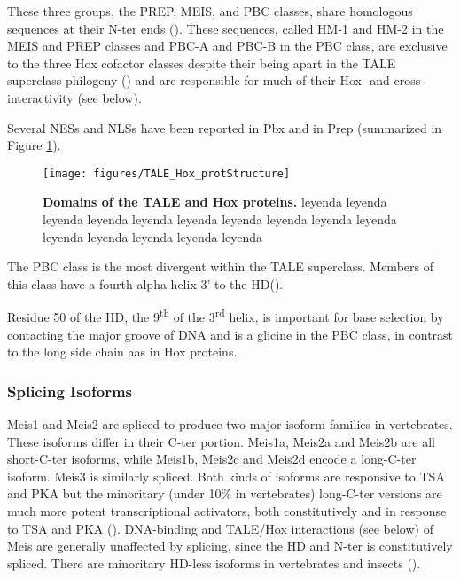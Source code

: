 These three groups, the PREP, MEIS, and PBC classes, share homologous sequences at their \ac{N-ter} ends (\cite{Burglin1998}). These sequences, called HM-1 and HM-2 in the MEIS and PREP classes and PBC-A and PBC-B in the PBC class, are exclusive to the three Hox cofactor classes despite their being apart in the \ac{TALE} superclass philogeny (\cite{Mukherjee2007}) and are responsible for much of their Hox- and cross-interactivity (see below).

Several \acp{NES} and \acp{NLS} have been reported in Pbx and in Prep (summarized in Figure \ref{fig:TALE_Hox_protStructure}).

\begin{figure}[]
  
  \centering
  \texttt{[image: figures/TALE\_Hox\_protStructure]}
  \caption[Domains of the TALE and Hox proteins]{\textbf{Domains of the TALE and Hox proteins.} leyenda leyenda leyenda leyenda leyenda leyenda leyenda leyenda leyenda leyenda leyenda leyenda leyenda leyenda leyenda}
  \label{fig:TALE_Hox_protStructure}
\end{figure}

The PBC class is the most divergent within the \ac{TALE} superclass. Members of this class have a fourth alpha helix 3' to the \ac{HD}(\cite{Mukherjee2007}). 

Residue 50 of the \ac{HD}, the 9\textsuperscript{th} of the 3\textsuperscript{rd} helix, is important for base selection by contacting the major groove of DNA and is a glicine in the PBC class, in contrast to the long side chain \acp{aa} in Hox proteins. %


\subsubsection{Splicing Isoforms}

Meis1 and Meis2 are spliced to produce two major isoform families in vertebrates. These isoforms differ in their \ac{C-ter} portion. Meis1a, Meis2a and Meis2b are all short-\ac{C-ter} isoforms, while Meis1b, Meis2c and Meis2d encode a long-\ac{C-ter} isoform. Meis3 is similarly spliced. Both kinds of isoforms are responsive to \ac{TSA} and \ac{PKA} but the minoritary (under 10\% in vertebrates) long-\ac{C-ter} versions are much more potent transcriptional activators, both constitutively and in response to \ac{TSA} and \ac{PKA} (\cite{Huang2005, Irimia2011}). DNA-binding and TALE/Hox interactions (see below) of Meis are generally unaffected by splicing, since the \ac{HD} and \ac{N-ter} is constitutively spliced. There are minoritary \ac{HD}-less isoforms in vertebrates and insects (\cite{Irimia2011}). 


